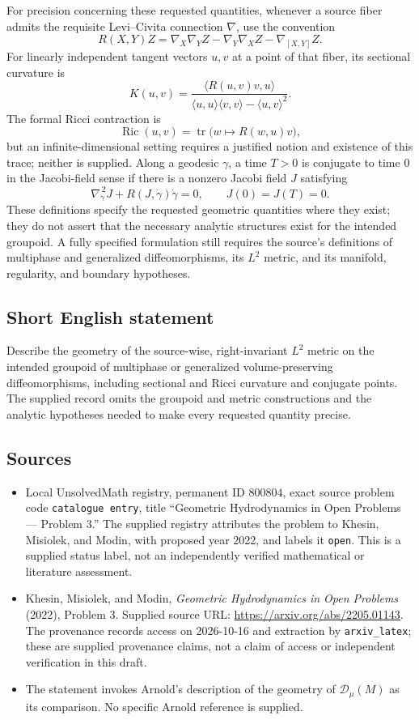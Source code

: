 \documentclass[11pt]{article}
\begin{document}
For precision concerning these requested quantities, whenever a source fiber admits the requisite Levi--Civita connection \(\nabla\), use the convention
\[
R(X,Y)Z=\nabla_X\nabla_YZ-\nabla_Y\nabla_XZ-\nabla_{[X,Y]}Z.
\]
For linearly independent tangent vectors \(u,v\) at a point of that fiber, its sectional curvature is
\[
K(u,v)=\frac{\langle R(u,v)v,u\rangle}
{\langle u,u\rangle\langle v,v\rangle-\langle u,v\rangle^2}.
\]
The formal Ricci contraction is
\[
\operatorname{Ric}(u,v)=\operatorname{tr}\bigl(w\longmapsto R(w,u)v\bigr),
\]
but an infinite-dimensional setting requires a justified notion and existence of this trace; neither is supplied. Along a geodesic \(\gamma\), a time \(T>0\) is conjugate to time \(0\) in the Jacobi-field sense if there is a nonzero Jacobi field \(J\) satisfying
\[
\nabla_{\dot\gamma}^{\,2}J+R(J,\dot\gamma)\dot\gamma=0,
\qquad J(0)=J(T)=0.
\]
These definitions specify the requested geometric quantities where they exist; they do not assert that the necessary analytic structures exist for the intended groupoid. A fully specified formulation still requires the source's definitions of multiphase and generalized diffeomorphisms, its \(L^2\) metric, and its manifold, regularity, and boundary hypotheses.
\subsection{Short English statement}
Describe the geometry of the source-wise, right-invariant \(L^2\) metric on the intended groupoid of multiphase or generalized volume-preserving diffeomorphisms, including sectional and Ricci curvature and conjugate points. The supplied record omits the groupoid and metric constructions and the analytic hypotheses needed to make every requested quantity precise.
\subsection{Sources}
\begin{itemize}
\item Local UnsolvedMath registry, permanent ID \(800804\), exact source problem code \texttt{catalogue entry}, title ``Geometric Hydrodynamics in Open Problems --- Problem 3.'' The supplied registry attributes the problem to Khesin, Misiolek, and Modin, with proposed year 2022, and labels it \texttt{open}. This is a supplied status label, not an independently verified mathematical or literature assessment.
\item Khesin, Misiolek, and Modin, \emph{Geometric Hydrodynamics in Open Problems} (2022), Problem 3. Supplied source URL: \url{https://arxiv.org/abs/2205.01143}. The provenance records access on 2026-10-16 and extraction by \texttt{arxiv\_latex}; these are supplied provenance claims, not a claim of access or independent verification in this draft.
\item The statement invokes Arnold's description of the geometry of \(\mathscr{D}_{\mu}(M)\) as its comparison. No specific Arnold reference is supplied.
\end{itemize}
\end{document}
